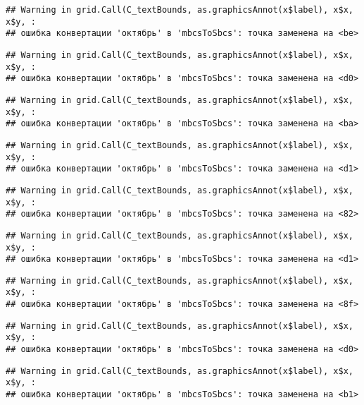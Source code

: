 \documentclass[
]{article}
\begin{document}
\begin{verbatim}
## Warning in grid.Call(C_textBounds, as.graphicsAnnot(x$label), x$x, x$y, :
## ошибка конвертации 'октябрь' в 'mbcsToSbcs': точка заменена на <be>
\end{verbatim}

\begin{verbatim}
## Warning in grid.Call(C_textBounds, as.graphicsAnnot(x$label), x$x, x$y, :
## ошибка конвертации 'октябрь' в 'mbcsToSbcs': точка заменена на <d0>
\end{verbatim}

\begin{verbatim}
## Warning in grid.Call(C_textBounds, as.graphicsAnnot(x$label), x$x, x$y, :
## ошибка конвертации 'октябрь' в 'mbcsToSbcs': точка заменена на <ba>
\end{verbatim}

\begin{verbatim}
## Warning in grid.Call(C_textBounds, as.graphicsAnnot(x$label), x$x, x$y, :
## ошибка конвертации 'октябрь' в 'mbcsToSbcs': точка заменена на <d1>
\end{verbatim}

\begin{verbatim}
## Warning in grid.Call(C_textBounds, as.graphicsAnnot(x$label), x$x, x$y, :
## ошибка конвертации 'октябрь' в 'mbcsToSbcs': точка заменена на <82>
\end{verbatim}

\begin{verbatim}
## Warning in grid.Call(C_textBounds, as.graphicsAnnot(x$label), x$x, x$y, :
## ошибка конвертации 'октябрь' в 'mbcsToSbcs': точка заменена на <d1>
\end{verbatim}

\begin{verbatim}
## Warning in grid.Call(C_textBounds, as.graphicsAnnot(x$label), x$x, x$y, :
## ошибка конвертации 'октябрь' в 'mbcsToSbcs': точка заменена на <8f>
\end{verbatim}

\begin{verbatim}
## Warning in grid.Call(C_textBounds, as.graphicsAnnot(x$label), x$x, x$y, :
## ошибка конвертации 'октябрь' в 'mbcsToSbcs': точка заменена на <d0>
\end{verbatim}

\begin{verbatim}
## Warning in grid.Call(C_textBounds, as.graphicsAnnot(x$label), x$x, x$y, :
## ошибка конвертации 'октябрь' в 'mbcsToSbcs': точка заменена на <b1>
\end{verbatim}
\end{document}
